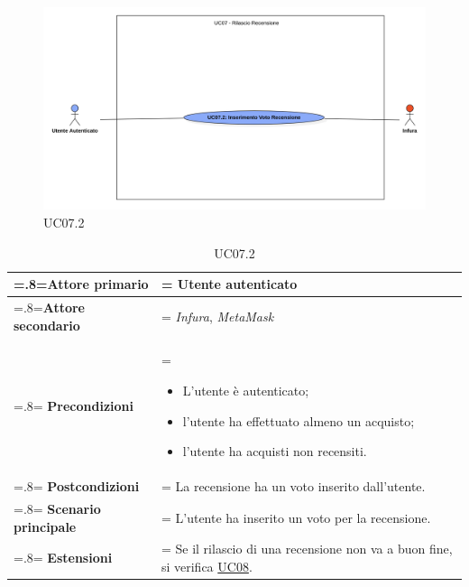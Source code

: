                 \begin{figure}[H]
                    \centering
                    \includegraphics[scale=0.4]{src/img/UC07.2.png}
                    \caption{UC07.2}
                \end{figure}

                \begin{table}[H]
                    \centering
                    \renewcommand{\arraystretch}{1.8}
                    \renewcommand\tabularxcolumn[1]{m{#1}}
                    \begin{tabularx}{0.9\textwidth}{
                        >{\hsize=.8\hsize\linewidth=\hsize}X
                        >{\hsize=1.2\hsize\linewidth=\hsize}X}
                        \hline
                        \textbf{Attore primario} & Utente autenticato \\
                        \hline
                        \textbf{Attore secondario} & \textit{Infura}, \textit{MetaMask} \\
                        \hline
                        \textbf{Precondizioni} &
                            \begin{itemize}
                                \item L'utente è autenticato;
                                \item l'utente ha effettuato almeno un acquisto;
                                \item l'utente ha acquisti non recensiti.
                            \end{itemize} \\
                        \hline
                        \textbf{Postcondizioni} & La recensione ha un voto inserito dall'utente. \\
                        \hline
                        \textbf{Scenario principale} &
                        L'utente ha inserito un voto per la recensione. \\
                        \hline
                        \textbf{Estensioni} & Se il rilascio di una recensione non va a buon fine, si verifica \hyperref[UC08]{UC08}. \\
                        \hline
                    \end{tabularx}
                    \caption{UC07.2}
                \end{table}


